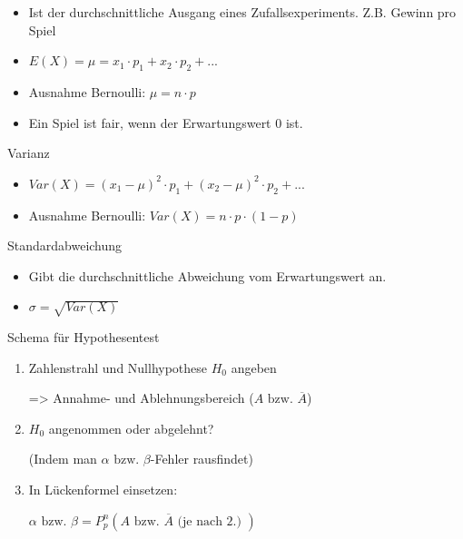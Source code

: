 \documentclass[paper=a6,landscape,ngerman,twoside=true,fontsize=12pt]{scrartcl}
\begin{document}
\begin{antwort}
	\begin{itemize}
		\item Ist der durchschnittliche Ausgang eines Zufallsexperiments.
		Z.B. Gewinn pro Spiel 
		\item $E(X)=\mu=x_1 \cdot p_1 + x_2 \cdot p_2 + ...$
		\item Ausnahme Bernoulli: $\mu=n \cdot p$
		\item Ein Spiel ist fair, wenn der Erwartungswert 0 ist.
	\end{itemize}	
\end{antwort}	
\begin{frage}
	Varianz
	
\end{frage}
\begin{antwort}
	\begin{itemize}
		\item $Var(X)=(x_1-\mu)^2 \cdot p_1+(x_2-\mu)^2 \cdot p_2+...$		
		\item Ausnahme Bernoulli: $Var(X)=n \cdot p \cdot (1-p)$	
	\end{itemize}	
\end{antwort}	
\begin{frage}
	Standardabweichung
	
\end{frage}
\begin{antwort}
	\begin{itemize}
		\item Gibt die durchschnittliche Abweichung vom Erwartungswert an.		
		\item $\sigma=\sqrt{Var(X)}$	
	\end{itemize}	
\end{antwort}	
\begin{frage}
	Schema für Hypothesentest
	
\end{frage}
\begin{antwort}
	\begin{enumerate}
		\item Zahlenstrahl und Nullhypothese $H_0$ angeben
		
		=> Annahme- und Ablehnungsbereich  ($A \text{ bzw. }\overline{A}$)	
		\item $H_0$ angenommen oder abgelehnt?
		
		(Indem man  $\alpha \text{ bzw. }\beta$-Fehler rausfindet) 	
		\item In Lückenformel einsetzen: 
		
		$\alpha \text{ bzw. }\beta=P^n_p(A\text{ bzw. }\overline{A}\text{ (je nach 2.) })$	
	\end{enumerate}
	
\end{antwort}	
\end{document}
